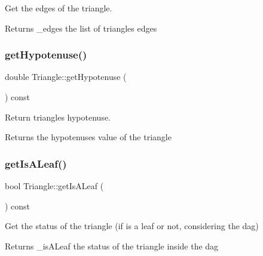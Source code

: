 Get the edges of the triangle. 

\begin{DoxyReturn}{Returns}
\+\_\+edges the list of triangle\textquotesingle{}s edges 
\end{DoxyReturn}
\mbox{\label{classTriangle_aea05889b09b94496f35019968eb728f7}} 
\subsubsection{\texorpdfstring{get\+Hypotenuse()}{getHypotenuse()}}
{\footnotesize\ttfamily double Triangle\+::get\+Hypotenuse (\begin{DoxyParamCaption}{ }\end{DoxyParamCaption}) const\hspace{0.3cm}{\ttfamily [inline]}}



Return triangle\textquotesingle{}s hypotenuse. 

\begin{DoxyReturn}{Returns}
the hypotenuse\textquotesingle{}s value of the triangle 
\end{DoxyReturn}
\mbox{\label{classTriangle_a92fb8b4f8ac36287416f61ae9a1065b4}} 
\subsubsection{\texorpdfstring{get\+Is\+A\+Leaf()}{getIsALeaf()}}
{\footnotesize\ttfamily bool Triangle\+::get\+Is\+A\+Leaf (\begin{DoxyParamCaption}{ }\end{DoxyParamCaption}) const\hspace{0.3cm}{\ttfamily [inline]}}



Get the status of the triangle (if is a leaf or not, considering the dag) 

\begin{DoxyReturn}{Returns}
\+\_\+is\+A\+Leaf the status of the triangle inside the dag 
\end{DoxyReturn}
\mbox{\label{classTriangle_a70da71528307c6b80cf0334f1ccd13a0}} 
